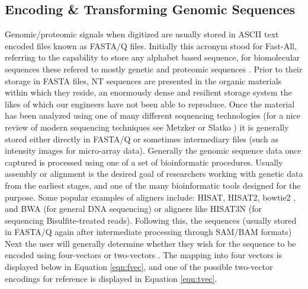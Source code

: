 \documentclass[12pt,conference]{IEEEtran}
\begin{document}
\subsection{Encoding \& Transforming Genomic Sequences}
Genomic/proteomic signals when digitized are usually stored in ASCII text encoded files known as FASTA/Q 
files.  Initially this acronym stood for Fast-All, referring to the capability to store any alphabet based 
sequence, for biomolecular sequences these refered to mostly genetic and proteomic sequences \cite{Lip85}.  
Prior to their storage in FASTA files, NT sequences are presented in the organic materials within which they reside, an enormously dense and resilient storage system the likes of which our engineers have not been able to reproduce. 
Once the material has been analyzed using one of many different sequencing technologies (for a nice review of modern sequencing techniques see Metzker \cite{Met10} or Slatko \cite{Sla18}) it is generally stored either directly in FASTA/Q or sometimes intermediary files (such as intensity images for micro-array data). 
Generally the genomic sequence data once captured is processed using one of a set of bioinformatic procedures. 
Usually assembly or alignment is the desired goal of researchers working with genetic data from the 
earliest stages, and one of the many bioinformatic tools designed for the purpose.  
Some popular examples of aligners include: HISAT, \cite{kim15} HISAT2\cite{Kim19}, bowtie2 \cite{lan12}, and BWA \cite{li09}  (for general DNA sequencing) or aligners like HISAT3N \cite{Zha20} (for sequencing Bisulfite-treated reads).
Following this, the sequences (usually stored in FASTA/Q again after intermediate processing through SAM/BAM formats)
Next the user will generally determine whether they wish for the sequence to be encoded using four-vectors or two-vectors \cite{Vos92}. 
The mapping into four vectors is displayed below in Equation \ref{eqn:fvec}, and one of the possible two-vector encodings for reference is displayed in Equation \ref{eqn:tvec}. 

\vspace{-1 em}

\vspace{-0.5 em}
\end{document}
